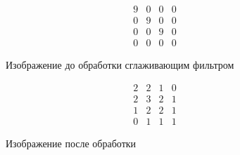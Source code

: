 \begin{figure}[h!]
    \centering
    \begin{minipage}{0.3\textwidth}
        $$
            \begin{matrix}
                9 & 0 & 0 & 0 \\
                0 & 9 & 0 & 0 \\
                0 & 0 & 9 & 0 \\
                0 & 0 & 0 & 0
            \end{matrix}
        $$
        \caption{Изображение до обработки сглаживающим фильтром}
        \label{fig:filter1}
    \end{minipage} %
    \hspace{0.1\textwidth}
    \begin{minipage}{0.3\textwidth}
        $$
            \begin{matrix}
                2 & 2 & 1 & 0 \\
                2 & 3 & 2 & 1 \\
                1 & 2 & 2 & 1 \\
                0 & 1 & 1 & 1
            \end{matrix}
        $$
        \caption{Изображение после обработки}
        \label{fig:filter2}
    \end{minipage}
\end{figure}
